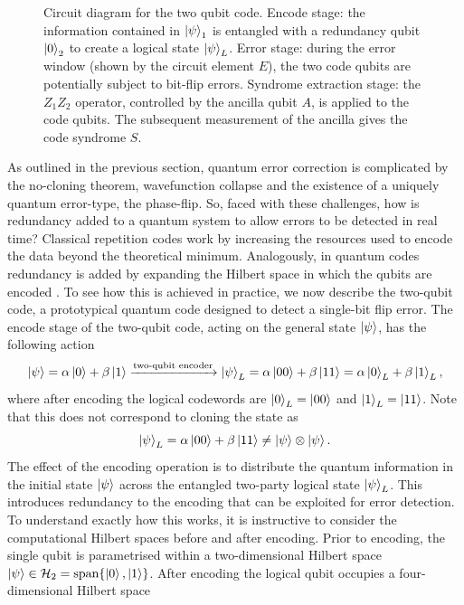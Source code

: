 \documentclass[]{arxiv}
\theoremstyle{plain}%
\theoremstyle{definition}
\theoremstyle{remark}
\begin{document}
\begin{figure}
	\centering
	
	\caption{Circuit diagram for the two qubit code. Encode stage: the information contained in $\ket{\psi}_1$ is entangled with a redundancy qubit $\ket{0}_2$ to create a logical state $\ket{\psi}_L$. Error stage: during the error window (shown by the circuit element $E$), the two code qubits are potentially subject to bit-flip errors. Syndrome extraction stage: the $Z_1Z_2$ operator, controlled by the ancilla qubit $A$, is applied to the code qubits. The subsequent measurement of the ancilla gives the code syndrome $S$.}
	\label{fig:two_qubit}
\end{figure}


As outlined in the previous section, quantum error correction is complicated by the no-cloning theorem, wavefunction collapse and the existence of a uniquely quantum error-type, the phase-flip. So, faced with these challenges, how is redundancy added to a quantum system to allow errors to be detected in real time? Classical repetition codes work by increasing the resources used to encode the data beyond the theoretical minimum. Analogously, in quantum codes redundancy is added by expanding the Hilbert space in which the qubits are encoded \cite{Shor95}. To see how this is achieved in practice, we now describe the two-qubit code, a prototypical quantum code designed to detect a single-bit flip error. The encode stage of the two-qubit code, acting on the general state $\ket{\psi}$, has the following action
%
\begin{equation}
\ket{\psi}=\alpha\ket{0}+\beta\ket{1}\xrightarrow{\text{two-qubit encoder}}\ket{\psi}_L=\alpha \ket{00}+\beta\ket{11}=\alpha\ket{0}_L+\beta\ket{1}_L\rm,
\end{equation}
%
where after encoding the logical codewords are $\ket{0}_L=\ket{00}$ and $\ket{1}_L=\ket{11}$. Note that this does not correspond to cloning the state as
%
\begin{equation}
\ket{\psi}_L=\alpha \ket{00} + \beta \ket{11} \neq \ket{\psi}\otimes \ket{\psi}\rm.
\end{equation}
%
The effect of the encoding operation is to distribute the quantum information in the initial state $\ket{\psi}$ across the entangled two-party logical state $\ket{\psi}_L$. This introduces redundancy to the encoding that can be exploited for error detection. To understand exactly how this works, it is instructive to consider the computational Hilbert spaces before and after encoding. Prior to encoding, the single qubit is parametrised within a two-dimensional Hilbert space $\ket{\psi}\in \mathcal{H}_2=\text{span}\{\ket{0},\ket{1}\}$. After encoding the logical qubit occupies a four-dimensional Hilbert space
\end{document}
